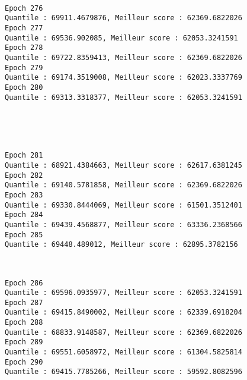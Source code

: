 \documentclass[11pt]{article}
\begin{document}
    \begin{center}
    \end{center}
    { \hspace*{\fill} \\}
    
    \begin{Verbatim}[commandchars=\\\{\}]
Epoch 276
Quantile : 69911.4679876, Meilleur score : 62369.6822026
Epoch 277
Quantile : 69536.902085, Meilleur score : 62053.3241591
Epoch 278
Quantile : 69722.8359413, Meilleur score : 62369.6822026
Epoch 279
Quantile : 69174.3519008, Meilleur score : 62023.3337769
Epoch 280
Quantile : 69313.3318377, Meilleur score : 62053.3241591

    \end{Verbatim}

    \begin{center}
    \end{center}
    { \hspace*{\fill} \\}
    
    \begin{center}
    \end{center}
    { \hspace*{\fill} \\}
    
    \begin{Verbatim}[commandchars=\\\{\}]
Epoch 281
Quantile : 68921.4384663, Meilleur score : 62617.6381245
Epoch 282
Quantile : 69140.5781858, Meilleur score : 62369.6822026
Epoch 283
Quantile : 69330.8444069, Meilleur score : 61501.3512401
Epoch 284
Quantile : 69439.4568877, Meilleur score : 63336.2368566
Epoch 285
Quantile : 69448.489012, Meilleur score : 62895.3782156

    \end{Verbatim}

    \begin{center}
    \end{center}
    { \hspace*{\fill} \\}
    
    \begin{Verbatim}[commandchars=\\\{\}]
Epoch 286
Quantile : 69596.0935977, Meilleur score : 62053.3241591
Epoch 287
Quantile : 69415.8490002, Meilleur score : 62339.6918204
Epoch 288
Quantile : 68833.9148587, Meilleur score : 62369.6822026
Epoch 289
Quantile : 69551.6058972, Meilleur score : 61304.5825814
Epoch 290
Quantile : 69415.7785266, Meilleur score : 59592.8082596

    \end{Verbatim}
\end{document}
